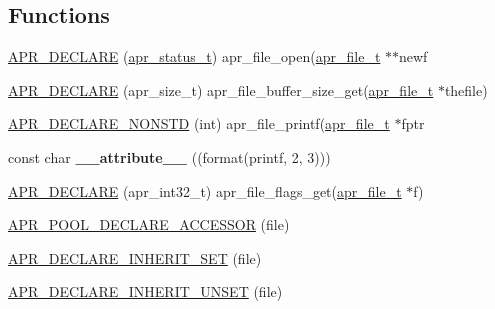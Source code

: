 \subsection*{Functions}
\begin{DoxyCompactItemize}
\item 
\mbox{\hyperlink{group__apr__file__io_ga6a59a988c3f3d792e2dd9e923f4f0bc4}{A\+P\+R\+\_\+\+D\+E\+C\+L\+A\+RE}} (\mbox{\hyperlink{group__apr__errno_gaf76ee4543247e9fb3f3546203e590a6c}{apr\+\_\+status\+\_\+t}}) apr\+\_\+file\+\_\+open(\mbox{\hyperlink{structapr__file__t}{apr\+\_\+file\+\_\+t}} $\ast$$\ast$newf
\item 
\mbox{\hyperlink{group__apr__file__io_gad950dd5773690685ffed1e4a02ccdefa}{A\+P\+R\+\_\+\+D\+E\+C\+L\+A\+RE}} (apr\+\_\+size\+\_\+t) apr\+\_\+file\+\_\+buffer\+\_\+size\+\_\+get(\mbox{\hyperlink{structapr__file__t}{apr\+\_\+file\+\_\+t}} $\ast$thefile)
\item 
\mbox{\hyperlink{group__apr__file__io_ga3c5a0f7acf9fc63278e0d50eaa916d2c}{A\+P\+R\+\_\+\+D\+E\+C\+L\+A\+R\+E\+\_\+\+N\+O\+N\+S\+TD}} (int) apr\+\_\+file\+\_\+printf(\mbox{\hyperlink{structapr__file__t}{apr\+\_\+file\+\_\+t}} $\ast$fptr
\item 
\mbox{\label{group__apr__file__io_ga44bb214856b287cad23bb7a57bbdd7ac}} 
const char {\bfseries \+\_\+\+\_\+attribute\+\_\+\+\_\+} ((format(printf, 2, 3)))
\item 
\mbox{\hyperlink{group__apr__file__io_ga9abb05e265685deb5a7db8ee8eb02237}{A\+P\+R\+\_\+\+D\+E\+C\+L\+A\+RE}} (apr\+\_\+int32\+\_\+t) apr\+\_\+file\+\_\+flags\+\_\+get(\mbox{\hyperlink{structapr__file__t}{apr\+\_\+file\+\_\+t}} $\ast$f)
\item 
\mbox{\hyperlink{group__apr__file__io_gaeceb47cbc35ab63c76677b75f6ab6ce5}{A\+P\+R\+\_\+\+P\+O\+O\+L\+\_\+\+D\+E\+C\+L\+A\+R\+E\+\_\+\+A\+C\+C\+E\+S\+S\+OR}} (file)
\item 
\mbox{\hyperlink{group__apr__file__io_ga5667f89b302ab25b3826408e2b8f0cb2}{A\+P\+R\+\_\+\+D\+E\+C\+L\+A\+R\+E\+\_\+\+I\+N\+H\+E\+R\+I\+T\+\_\+\+S\+ET}} (file)
\item 
\mbox{\hyperlink{group__apr__file__io_ga42827bfed9a99a3ae9eebe52d11c3193}{A\+P\+R\+\_\+\+D\+E\+C\+L\+A\+R\+E\+\_\+\+I\+N\+H\+E\+R\+I\+T\+\_\+\+U\+N\+S\+ET}} (file)
\end{DoxyCompactItemize}
